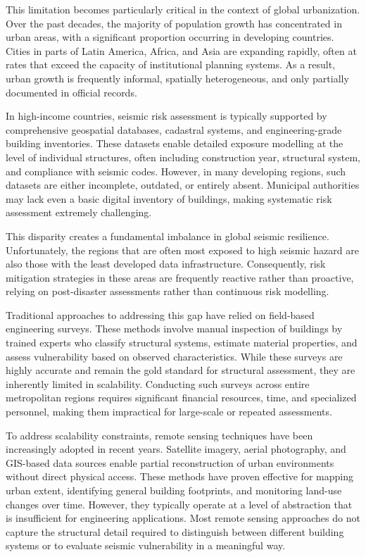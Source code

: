 This limitation becomes particularly critical in the context of global urbanization. Over the past decades, the majority of population growth has concentrated in urban areas, with a significant proportion occurring in developing countries. Cities in parts of Latin America, Africa, and Asia are expanding rapidly, often at rates that exceed the capacity of institutional planning systems. As a result, urban growth is frequently informal, spatially heterogeneous, and only partially documented in official records.

In high-income countries, seismic risk assessment is typically supported by comprehensive geospatial databases, cadastral systems, and engineering-grade building inventories. These datasets enable detailed exposure modelling at the level of individual structures, often including construction year, structural system, and compliance with seismic codes. However, in many developing regions, such datasets are either incomplete, outdated, or entirely absent. Municipal authorities may lack even a basic digital inventory of buildings, making systematic risk assessment extremely challenging.

This disparity creates a fundamental imbalance in global seismic resilience. Unfortunately, the regions that are often most exposed to high seismic hazard are also those with the least developed data infrastructure. Consequently, risk mitigation strategies in these areas are frequently reactive rather than proactive, relying on post-disaster assessments rather than continuous risk modelling.

Traditional approaches to addressing this gap have relied on field-based engineering surveys. These methods involve manual inspection of buildings by trained experts who classify structural systems, estimate material properties, and assess vulnerability based on observed characteristics. While these surveys are highly accurate and remain the gold standard for structural assessment, they are inherently limited in scalability. Conducting such surveys across entire metropolitan regions requires significant financial resources, time, and specialized personnel, making them impractical for large-scale or repeated assessments.

To address scalability constraints, remote sensing techniques have been increasingly adopted in recent years. Satellite imagery, aerial photography, and GIS-based data sources enable partial reconstruction of urban environments without direct physical access. These methods have proven effective for mapping urban extent, identifying general building footprints, and monitoring land-use changes over time. However, they typically operate at a level of abstraction that is insufficient for engineering applications. Most remote sensing approaches do not capture the structural detail required to distinguish between different building systems or to evaluate seismic vulnerability in a meaningful way.

